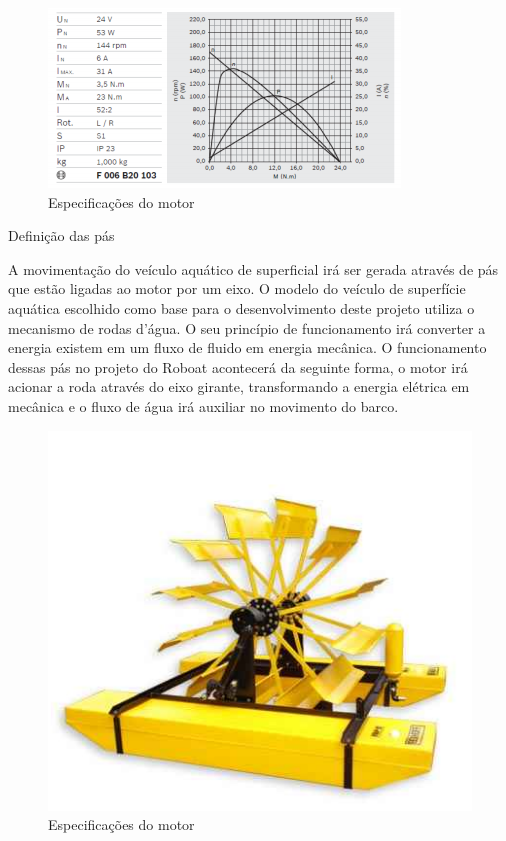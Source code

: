\begin{figure} [!htp]
	\centering
	\includegraphics[scale=0.6]{figuras/especificacoes}
	\caption{ Especificações do motor}
	\label{especificacoes}
\end{figure}
\FloatBarrier

Definição das pás

A movimentação do veículo aquático de superficial irá ser gerada através de pás que estão ligadas ao motor por um eixo. O modelo do veículo de superfície aquática escolhido como base para o desenvolvimento deste projeto utiliza o mecanismo de rodas d’água. O seu princípio de funcionamento irá converter a energia existem em um fluxo de fluido em energia mecânica. O funcionamento dessas pás no projeto do Roboat acontecerá da seguinte forma, o motor irá acionar a roda através do eixo girante, transformando a energia elétrica em mecânica e o fluxo de água irá auxiliar no movimento do barco.

\FloatBarrier


\begin{figure} [!htp]
	\centering
	\includegraphics[scale=0.6]{figuras/pas}
	\caption{ Especificações do motor}
	\label{pas}
\end{figure}
\FloatBarrier

